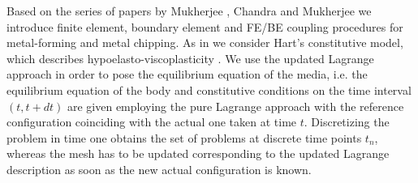 Based on the series of papers by Mukherjee \cite{Mu82}, Chandra and  Mukherjee \cite{MuChaDBE3,MuCha84,MuCha84a} we introduce  finite element, boundary element and FE/BE coupling procedures for metal-forming and metal chipping.  As in \cite{Ha76,Ha82,LeMa77} we consider Hart's constitutive model, which describes  hypoelasto-viscoplasticity \cite{Belytschko2000}. We use the updated Lagrange approach in order to pose the equilibrium equation of the media, i.e. the equilibrium equation of the body and constitutive conditions on the time interval $(t,t+dt)$ are given employing the pure Lagrange approach with the reference configuration coinciding with the actual one taken at time $t$. Discretizing the problem in time one obtains the set of problems at discrete time points $t_n$, whereas the mesh has to be updated corresponding to the updated Lagrange description as soon as the new actual configuration is known.



